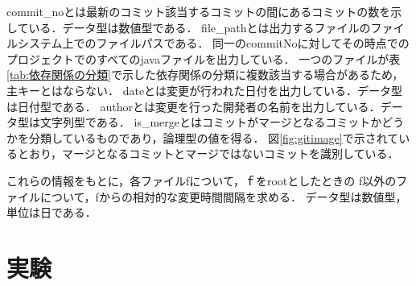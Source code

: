 \documentclass{fose2016}           %
\begin{document}
commit\_noとは最新のコミット該当するコミットの間にあるコミットの数を示している．データ型は数値型である．
file\_pathとは出力するファイルのファイルシステム上でのファイルパスである．
同一のcommitNoに対してその時点でのプロジェクトでのすべてのjavaファイルを出力している．
一つのファイルが表\ref{tab:依存関係の分類}で示した依存関係の分類に複数該当する場合があるため，主キーとはならない．
dateとは変更が行われた日付を出力している．データ型は日付型である．
authorとは変更を行った開発者の名前を出力している．データ型は文字列型である．
is\_mergeとはコミットがマージとなるコミットかどうかを分類しているものであり，論理型の値を得る．
図\ref{fig:gitimage}で示されているとおり，マージとなるコミットとマージではないコミットを識別している．

これらの情報をもとに，各ファイルfについて，ｆをrootとしたときの
f以外のファイルについて，fからの相対的な変更時間間隔を求める．
データ型は数値型，単位は日である．
\section{実験}\label{実験}

\end{document}
